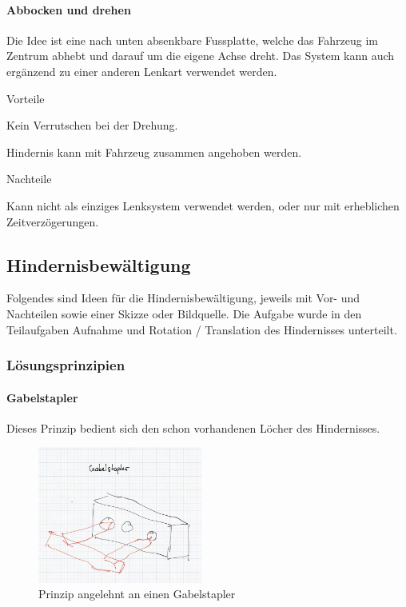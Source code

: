 \documentclass[../main.tex]{subfiles}
\begin{document}
\paragraph{Abbocken und drehen} \label{recherche-abbocken-und-drehen}

Die Idee ist eine nach unten absenkbare Fussplatte, welche das Fahrzeug im Zentrum abhebt und darauf um die eigene Achse dreht. Das System kann auch ergänzend zu einer anderen Lenkart verwendet werden.

\begin{minipage}[t]{0.48\textwidth}
    \begin{items}
      \item [Vorteile]
      \item Kein Verrutschen bei der Drehung.
      \item Hindernis kann mit Fahrzeug zusammen angehoben werden.
 \end{items}
\end{minipage}
\hfill
\begin{minipage}[t]{0.48\textwidth}
    \begin{items}
      \item [Nachteile]
      \item Kann nicht als einziges Lenksystem verwendet werden, oder nur mit erheblichen Zeitverzögerungen.
    \end{items}
\end{minipage}

\newpage
\subsection{Hindernisbewältigung}
Folgendes sind Ideen für die Hindernisbewältigung, jeweils mit Vor- und Nachteilen sowie einer Skizze oder Bildquelle. Die Aufgabe wurde in den Teilaufgaben Aufnahme und Rotation / Translation des Hindernisses unterteilt. 

\subsubsection{Lösungsprinzipien}
\paragraph{Gabelstapler}
Dieses Prinzip bedient sich den schon vorhandenen Löcher des Hindernisses.

\begin{figure}[h!]
        \centering
        \includegraphics[width=0.48\textwidth]{img/technologierecherche/Aufnahme/Gabelstapler.jpg}
        \caption{Prinzip angelehnt an einen Gabelstapler}
        \label{img:tech_Gaplerstapler}
\end{figure}
\end{document}
